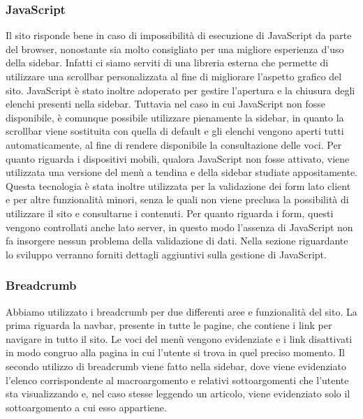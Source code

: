 \documentclass[12pt]{article}
\begin{document}
	\subsubsection{JavaScript}
	Il sito risponde bene in caso di impossibilità di esecuzione di JavaScript da parte del browser, nonostante sia molto consigliato per una migliore esperienza d'uso della sidebar. Infatti ci siamo serviti di una libreria esterna che permette di utilizzare una scrollbar personalizzata al fine di migliorare l'aspetto grafico del sito. JavaScript è stato inoltre adoperato per gestire l'apertura e la chiusura degli elenchi presenti nella sidebar. Tuttavia nel caso in cui JavaScript non fosse disponibile, è comunque possibile utilizzare pienamente la sidebar, in quanto la scrollbar viene sostituita con quella di default e gli elenchi vengono aperti tutti automaticamente, al fine di rendere disponibile la consultazione delle voci. Per quanto riguarda i dispositivi mobili, qualora JavaScript non fosse attivato, viene utilizzata una versione del menù a tendina e della sidebar studiate appositamente. 
	Questa tecnologia è stata inoltre utilizzata per la validazione dei form lato client e per altre funzionalità minori, senza le quali non viene preclusa la possibilità di utilizzare il sito e consultarne i contenuti. Per quanto riguarda i form, questi vengono controllati anche lato server, in questo modo l'assenza di JavaScript non fa insorgere nessun problema della validazione di dati. Nella sezione  riguardante lo sviluppo verranno forniti dettagli aggiuntivi sulla gestione di JavaScript.
	\subsubsection{Breadcrumb}
	Abbiamo utilizzato i breadcrumb per due differenti aree e funzionalità del sito. La prima riguarda la navbar, presente in tutte le pagine, che contiene i link per navigare in tutto il sito. Le voci del menù vengono evidenziate e i link disattivati in modo congruo alla pagina in cui l'utente si trova in quel preciso momento. Il secondo utilizzo di breadcrumb viene fatto nella sidebar, dove viene evidenziato l'elenco corrispondente al macroargomento e relativi sottoargomenti che l'utente sta visualizzando e, nel caso stesse leggendo un articolo, viene evidenziato solo il sottoargomento a cui esso appartiene.
\end{document}
